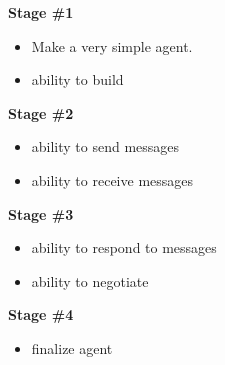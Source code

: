 \textbf{Stage \#1}
\begin{itemize}
\item Make a very simple agent.
\item ability to build
\end{itemize}

\textbf{Stage \#2}
\begin{itemize}
\item ability to send messages
\item ability to receive messages
\end{itemize}

\textbf{Stage \#3}
\begin{itemize}
\item ability to respond to messages
\item ability to negotiate
\end{itemize}

\textbf{Stage \#4}
\begin{itemize}
\item finalize agent
\end{itemize}
